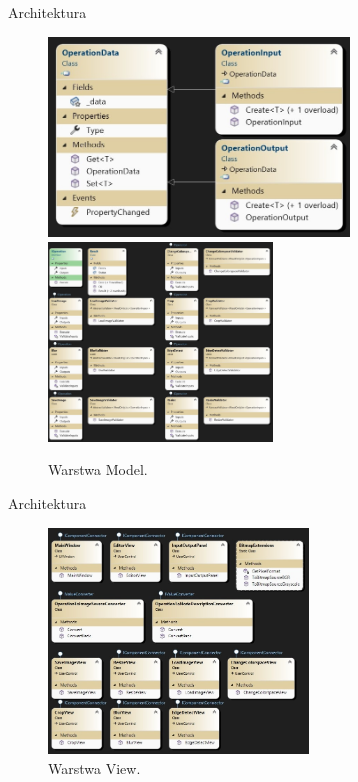 \documentclass[aspectratio=1610,handout]{beamer}
\theoremstyle{definition}
\begin{document}
\begin{frame}{Architektura}
    \begin{figure}
            \includegraphics[height=5.3cm]{./imgs/generyczne.jpg}%
            \hfil
            \includegraphics[height=5.3cm]{./imgs/operacje.jpg}
            \caption{Warstwa Model.}
    \end{figure}
\end{frame}

\begin{frame}{Architektura}
    \begin{figure}
            \includegraphics[height=6cm]{./imgs/widok.jpg}%
            \caption{Warstwa View.}
    \end{figure}
\end{frame}
\end{document}
